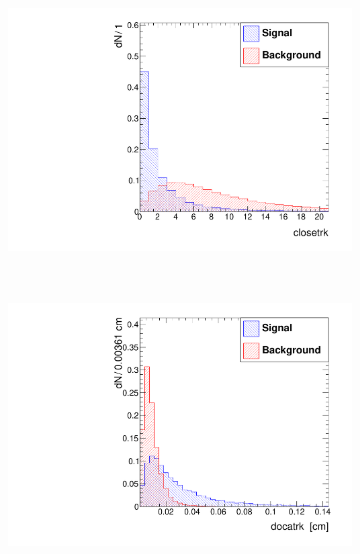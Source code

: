 \documentclass[10pt,a4paper]{article}
\begin{document}
\begin{figure}
\begin{subfigure}[b]{0.2\textwidth}
                \includegraphics[width=\textwidth]{Figures/closetrk_endcaps}
                \label{fig:closetrkEndcaps}
        \end{subfigure}
        ~
        \begin{subfigure}[b]{0.2\textwidth}
                \centering
                \includegraphics[width=\textwidth]{Figures/docatrk_endcaps}
                \label{fig:docatrkEndcaps}
        \end{subfigure}


\end{figure}
\end{document}
